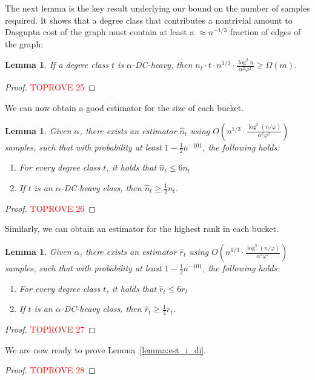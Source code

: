 \documentclass[letterpaper,11pt]{article}
\theoremstyle{plain}
\newtheorem{lemma}[theorem]{Lemma}
\theoremstyle{definition}
\theoremstyle{remark}
\begin{document}
The next lemma is the key result underlying our bound on the number of samples required. It shows that a degree class that contributes a nontrivial amount to Dasgupta cost of the graph must contain at least a $\approx n^{-1/3}$ fraction of edges of the graph:
\begin{lemma}\label{lemma:heav_deg_class}
    If a degree class $t$ is $\alpha$-DC-heavy, then  $n_t \cdot t  \cdot n^{1/3}\cdot \frac{\log^2 n}{\alpha^2 \varphi^2}  \geq \Omega(m). $
\end{lemma}

\begin{proof}\textcolor{red}{TOPROVE 25}\end{proof}
We can now obtain a good estimator for the size of each bucket. 
\begin{lemma}\label{lemma:nhat}
 Given $\alpha$, there exists an estimator $\hat{n}_t$ using $O\left(n^{1/3} \cdot \frac{\log^3 (n/\varphi)}{\alpha^2 \varphi^2}\right)$ samples, such that with probability at least $1-\frac{1}{2}n^{-101}$, the following holds: 
\begin{enumerate}
    \item For every degree class $t$, it holds that $\hat{n}_t \leq 6n_t$
    \item If $t$ is an $\alpha$-DC-heavy class, then $\hat{n}_t \geq  \frac{1}{2}n_t$. 
 \end{enumerate}
\end{lemma}
\begin{proof}\textcolor{red}{TOPROVE 26}\end{proof}
Similarly, we can obtain an estimator for the highest rank in each bucket. 
\begin{lemma}\label{lemma:rhat}
 Given $\alpha$, there exists an estimator $\hat{r}_t$ using  $O\left(n^{1/3} \cdot \frac{\log^5 (n/\varphi)}{\alpha^2 \varphi^2}\right)$  samples, such that with probability at least $1-\frac{1}{2}n^{-101}$, the following holds: 
\begin{enumerate}
    \item For every degree class $t$, it holds that $\hat{r}_t \leq 6r_t$
    \item If $t$ is an $\alpha$-DC-heavy class, then $\hat{r}_t \geq  \frac{1}{4}r_t$. 
 \end{enumerate}
\end{lemma}
\begin{proof}\textcolor{red}{TOPROVE 27}\end{proof}
We are now ready to prove Lemma~\ref{lemma:est_i_di}.
\begin{proof}\textcolor{red}{TOPROVE 28}\end{proof}
\end{document}
